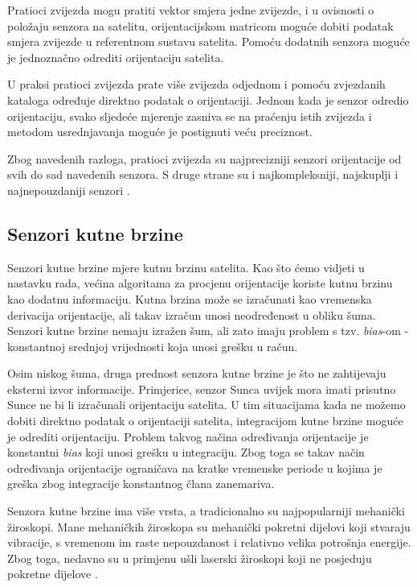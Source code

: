 \documentclass[times, utf8, diplomski, numeric]{templates/template}
\begin{document}
{{{{                Pratioci zvijezda mogu pratiti vektor smjera jedne zvijezde, i u ovisnosti o položaju senzora na satelitu, orijentacijskom matricom moguće dobiti podatak smjera zvijezde u referentnom sustavu satelita. Pomoću dodatnih senzora moguće je jednoznačno odrediti orijentaciju satelita. 

                U praksi pratioci zvijezda prate više zvijezda odjednom i pomoću zvjezdanih kataloga \cite{starCatalogs} određuje direktno podatak o orijentaciji. Jednom kada je senzor odredio orijentaciju, svako sljedeće mjerenje zasniva se na praćenju istih zvijezda i metodom usrednjavanja moguće je postignuti veću preciznost. 

                Zbog navedenih razloga, pratioci zvijezda su najprecizniji senzori orijentacije od svih do sad navedenih senzora. S druge strane su i najkompleksniji, najskuplji i najnepouzdaniji senzori \cite{adcsKnjiga}. 
            }
        }

        \subsection{Senzori kutne brzine}{
        \label{subsection:senzori_kutne_brzine}
            Senzori kutne brzine mjere kutnu brzinu satelita. Kao što ćemo vidjeti u nastavku rada, većina algoritama za procjenu orijentacije koriste kutnu brzinu kao dodatnu informaciju. Kutna brzina može se izračunati kao vremenska derivacija orijentacije, ali takav izračun unosi neodređenost u obliku šuma. Senzori kutne brzine nemaju izražen šum, ali zato imaju problem s tzv. \emph{bias}-om - konstantnoj srednjoj vrijednosti koja unosi grešku u račun. 

            Osim niskog šuma, druga prednost senzora kutne brzine je što ne zahtijevaju eksterni izvor informacije. Primjerice, senzor Sunca uvijek mora imati prisutno Sunce ne bi li izračunali orijentaciju satelita. U tim situacijama kada ne možemo dobiti direktno podatak o orijentaciji satelita, integracijom kutne brzine moguće je odrediti orijentaciju. Problem takvog načina određivanja orijentacije je konstantni \emph{bias} koji unosi grešku u integraciju. Zbog toga se takav način određivanja orijentacije ograničava na kratke vremenske periode u kojima je greška zbog integracije konstantnog člana zanemariva.

            Senzora kutne brzine ima više vrsta, a tradicionalno su najpopularniji mehanički žiroskopi. Mane mehaničkih žiroskopa su mehanički pokretni dijelovi koji stvaraju vibracije, s vremenom im raste nepouzdanost i relativno velika potrošnja energije. Zbog toga, nedavno su u primjenu ušli laserski žiroskopi koji ne posjeduju pokretne dijelove \cite{adcsKnjiga}. 

}}}
\end{document}
